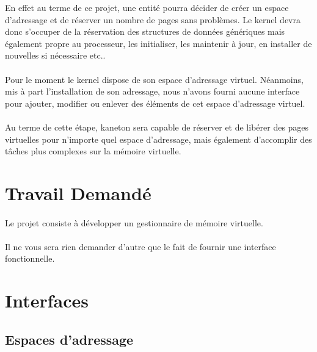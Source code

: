 \documentclass[10pt,a4wide]{article}
\begin{document}
En effet au terme de ce projet, une entit\'e pourra d\'ecider de cr\'eer
un espace d'adressage et de r\'eserver un nombre de pages sans probl\`emes.
Le kernel devra donc s'occuper de la r\'eservation des structures de
donn\'ees g\'en\'eriques mais \'egalement propre au processeur, les
initialiser, les maintenir \`a jour, en installer de nouvelles si n\'ecessaire
etc..

\paragraph{}

Pour le moment le kernel dispose de son espace d'adressage virtuel.
N\'eanmoins, mis \`a part l'installation de son adressage, nous n'avons
fourni aucune interface pour ajouter, modifier ou enlever des \'el\'ements
de cet espace d'adressage virtuel.

\paragraph{}

Au terme de cette \'etape, kaneton sera capable de r\'eserver et
de lib\'erer des pages virtuelles pour n'importe quel espace d'adressage,
mais \'egalement d'accomplir des t\^aches plus complexes sur la
m\'emoire virtuelle.

\section{Travail Demand\'e}

\paragraph{}

Le projet consiste \`a d\'evelopper un gestionnaire de m\'emoire virtuelle.

\paragraph{}

Il ne vous sera rien demander d'autre que le fait de fournir une interface
fonctionnelle.

\section{Interfaces}

\subsection{Espaces d'adressage}
\end{document}
